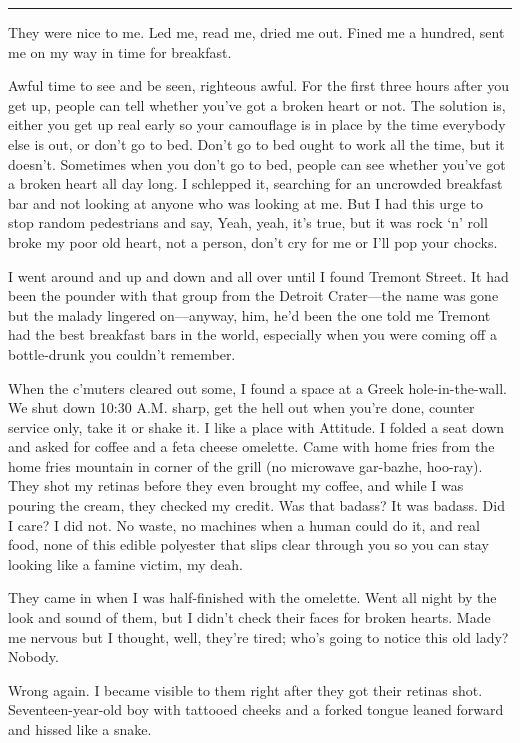 \fancybreak{* * *}

They were nice to me. Led me, read me, dried me out. Fined me a hundred, sent me on my way in time for breakfast.

Awful time to see and be seen, righteous awful. For the first three hours after you get up, people can tell whether you've got a broken heart or not. The solution is, either you get up real early so your camouflage is in place by the time everybody else is out, or don't go to bed. Don't go to bed ought to work all the time, but it doesn't. Sometimes when you don't go to bed, people can see whether you've got a broken heart all day long. I schlepped it, searching for an uncrowded breakfast bar and not looking at anyone who was looking at me. But I had this urge to stop random pedestrians and say, Yeah, yeah, it's true, but it was rock `n' roll broke my poor old heart, not a person, don't cry for me or I'll pop your chocks.

I went around and up and down and all over until I found Tremont Street. It had been the pounder with that group from the Detroit Crater—the name was gone but the malady lingered on—anyway, him, he'd been the one told me Tremont had the best breakfast bars in the world, especially when you were coming off a bottle-drunk you couldn't remember.

When the c'muters cleared out some, I found a space at a Greek hole-in-the-wall. We shut down 10:30 A.M. sharp, get the hell out when you're done, counter service only, take it or shake it. I like a place with Attitude. I folded a seat down and asked for coffee and a feta cheese omelette. Came with home fries from the home fries mountain in corner of the grill (no microwave gar-bazhe, hoo-ray). They shot my retinas before they even brought my coffee, and while I was pouring the cream, they checked my credit. Was that badass? It was badass. Did I care? I did not. No waste, no machines when a human could do it, and real food, none of this edible polyester that slips clear through you so you can stay looking like a famine victim, my deah.

They came in when I was half-finished with the omelette. Went all night by the look and sound of them, but I didn't check their faces for broken hearts. Made me nervous but I thought, well, they're tired; who's going to notice this old lady? Nobody.

Wrong again. I became visible to them right after they got their retinas shot. Seventeen-year-old boy with tattooed cheeks and a forked tongue leaned forward and hissed like a snake.

